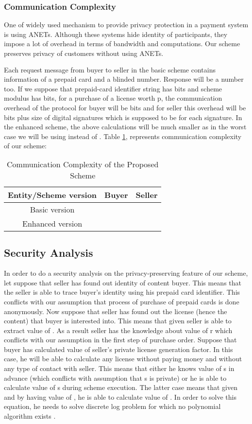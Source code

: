 \documentclass[times]{secauth}
\begin{document}
\subsubsection{Communication Complexity}
One of widely used mechanism to provide privacy protection in a payment system is using ANETs. Although these systems hide identity of participants, they impose a lot of overhead in terms of bandwidth and computations. Our scheme preserves privacy of customers without using ANETs.
\par Each request message from buyer to seller in the basic scheme contains information of a prepaid card and a blinded number. Response will be a number too. If we suppose that prepaid-card identifier string has  bits and scheme modulus has  bits, for a purchase of a license worth p, the communication overhead of the protocol for buyer will be  bits and for seller this overhead will be  bits plus size of digital signatures which is supposed to be  for each signature.
In the enhanced scheme, the above calculations will be much smaller as in the worst case we will be using  instead of . 
Table \ref{table:commproposed}, represents communication complexity of our scheme:

\begin{table}
\caption{Communication Complexity of the Proposed Scheme}
\begin{tabular}{|c|c|c|}
\hline \textbf{Entity/Scheme version} & \textbf{Buyer} & \textbf{Seller} \\ 
\hline Basic version &  &  \\ 
\hline Enhanced version &  &  \\ 
\hline 
\end{tabular} 
\label{table:commproposed}
\end{table}

\subsection{Security Analysis}
\label{sec:security_analysis}
In order to do a security analysis on the privacy-preserving feature of our scheme, let suppose that seller has found out identity of content buyer. This means that the seller is able to trace buyer's identity using his prepaid card identifier. This conflicts with our assumption that process of purchase of prepaid cards is done anonymously.
Now suppose that seller has found out the license (hence the content) that buyer is interested into. This means that given  seller is able to extract value of . As a result seller has the knowledge about value of r which conflicts with our assumption in the first step of purchase order.
Suppose that buyer has calculated value of seller's private license generation factor. In this case, he will be able to calculate any license without paying money and without any type of contact with seller. This means that either he knows value of s in advance (which conflicts with assumption that s is private) or he is able to calculate value of s during scheme execution. The latter case means that given  and by having value of , he is able to calculate value of . In order to solve this equation, he needs to solve discrete log problem for which no polynomial algorithm exists \cite{N41, N42}.
\end{document}
